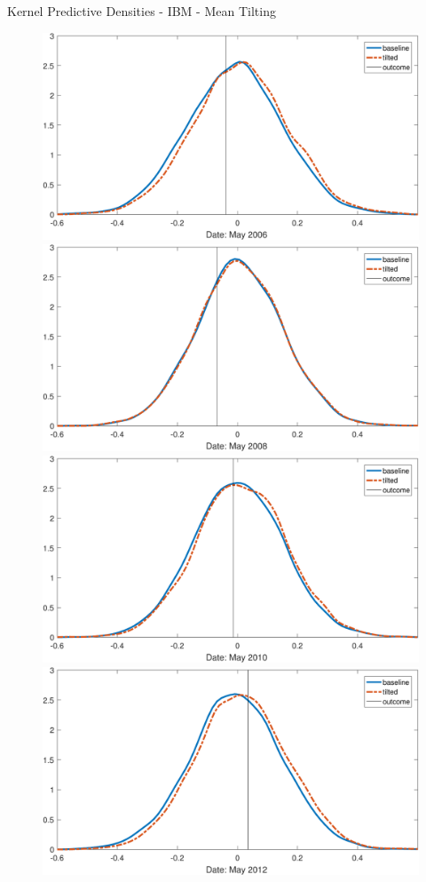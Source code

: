 \documentclass[9pt,xcolor=x11names,compress]{beamer}
\theoremstyle{standard}
\theoremstyle{notes}
\begin{document}
\begin{frame}{Kernel Predictive Densities - IBM - Mean Tilting}
	\begin{figure}
		\centering
		\includegraphics[width=0.49\linewidth]{../../Tex/plots/IBM_density_m1}
		\includegraphics[width=0.49\linewidth]{../../Tex/plots/IBM_density_m2}\\
		\includegraphics[width=0.49\linewidth]{../../Tex/plots/IBM_density_m3}
		\includegraphics[width=0.49\linewidth]{../../Tex/plots/IBM_density_m4}
		\label{fig:ibmdensplotm}
	\end{figure}
\end{frame}
\end{document}
